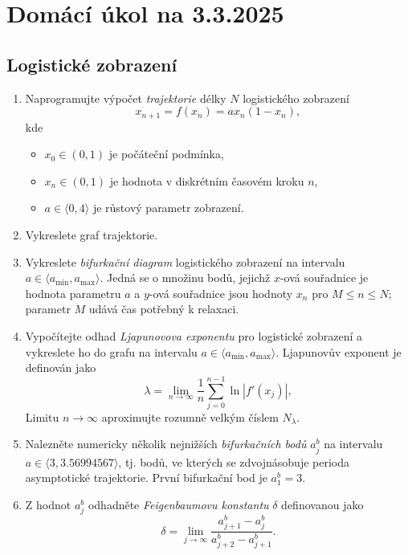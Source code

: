 \documentclass[a4paper,11pt,twoside]{article}
\def\abs#1{\left|#1\right|}
\begin{document}
\section*{Domácí úkol na 3.3.2025}
\subsection*{Logistické zobrazení}
\begin{enumerate}
    \item 
        Naprogramujte výpočet \emph{trajektorie} délky $N$ logistického zobrazení
        \begin{equation}
            x_{n+1}=f(x_{n})=ax_{n}(1-x_{n}),
        \end{equation}
        kde 
        \begin{itemize}
            \item $x_{0}\in(0,1)$ je počáteční podmínka,
            \item $x_{n}\in(0,1)$ je hodnota v diskrétním časovém kroku $n$,
            \item $a\in\langle 0,4\rangle$ je růstový parametr zobrazení.
        \end{itemize}
    \item
        Vykreslete graf trajektorie.

    \item 
        Vykreslete \emph{bifurkační diagram} logistického zobrazení na intervalu $a\in\langle a_{\mathrm{min}},a_{\mathrm{max}}\rangle$.
        Jedná se o množinu bodů, jejichž $x$-ová souřadnice je hodnota parametru $a$ a $y$-ová souřadnice jsou hodnoty $x_{n}$ pro $M\leq n\leq N$; parametr $M$ udává čas potřebný k relaxaci.

    \item
        Vypočítejte odhad \emph{Ljapunovova exponentu} pro logistické zobrazení a vykreslete ho do grafu na intervalu $a\in\langle a_{\mathrm{min}},a_{\mathrm{max}}\rangle$.
        Ljapunovův exponent je definován jako
        \begin{equation}
            \lambda=\lim_{n\to\infty}\frac{1}{n}\sum_{j=0}^{n-1}\ln\abs{f'(x_{j})},
        \end{equation}
        Limitu $n\rightarrow\infty$ aproximujte rozumně velkým číslem $N_\lambda$.

    \item
        Nalezněte numericky několik nejnižších \emph{bifurkačních bodů} $a^b_{j}$ na intervalu $a\in\langle 3,3.56994567\rangle$, tj. bodů, ve kterých se zdvojnásobuje perioda asymptotické trajektorie.
        První bifurkační bod je $a^b_{1}=3$.

    \item
        Z hodnot $a^b_{j}$ odhadněte \emph{Feigenbaumovu konstantu} $\delta$ definovanou jako
        \begin{equation}
            \delta=\lim_{j\to\infty}\frac{a^b_{j+1}-a^b_{j}}{a^b_{j+2}-a^b_{j+1}}.
        \end{equation}
\end{enumerate}
\end{document}
